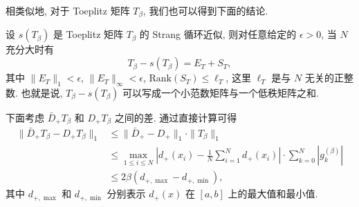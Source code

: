 \documentclass{ecnumaster}
\begin{document}
相类似地, 对于 Toeplitz 矩阵 $T_{\beta}$, 我们也可以得到下面的结论.   
\begin{theorem}\label{Th:s-T0}
  设 $s(T_{\beta})$ 是 Toeplitz 矩阵 $T_{\beta}$ 的 Strang 循环近似, 
  则对任意给定的 $\epsilon>0$, 当 $N$ 充分大时有 
  $$T_{\beta} - s(T_{\beta}) = E_T + S_T,$$
  其中 $\|E_T\|_1<\epsilon$, $\|E_T\|_\infty<\epsilon$, $\mathrm{Rank}(S_T)\leq\ell_T$,
  这里 $\ell_T$ 是与 $N$ 无关的正整数.
  也就是说, $T_{\beta} - s(T_{\beta})$ 可以写成一个小范数矩阵与一个低秩矩阵之和.  
\end{theorem}

下面考虑 $\bar{D}_+ T_{\beta}$ 和 $D_+ T_{\beta}$ 之间的差.
通过直接计算可得
\begin{align*}
  \|\bar{D}_+ T_{\beta} - D_+ T_{\beta}\|_1 
  & \leq \|\bar{D}_+ - D_+\|_1\cdot \|T_{\beta}\|_1 \\
  & \leq \max _{1 \leq i \leq N} 
    \left|d_{+}(x_i) - \frac{1}{N} \sum\limits _{i=1}^{N} d_{+}(x_i)\right|
    \cdot \sum\limits _{k=0}^{N} |g_k^{(\beta)}|\\
  &\leq 2\beta (d_{+,\max}-d_{+,\min}),
\end{align*}
其中 $d_{+,\max}$ 和 $d_{+,\min}$ 分别表示 $d_+(x)$
在 $[a,b]$ 上的最大值和最小值.
  
\end{document}

